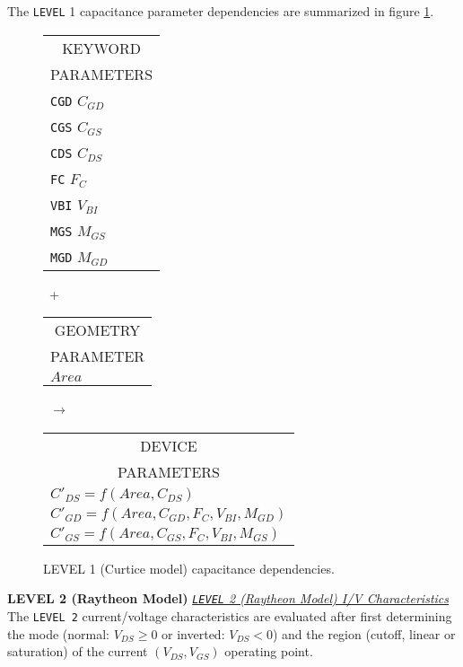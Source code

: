 The {\tt LEVEL} 1 capacitance parameter dependencies are summarized in figure
\ref{blevel1cap}.\\[0.2in]
\begin{figure}[h]
\begin{tabular}[t]{|p{1in}|}
\hline
\multicolumn{1}{|c|}{KEYWORD} \\
\multicolumn{1}{|c|}{PARAMETERS} \\
\hline
\hline
{\tt CGD} \hfill $C_{GD}$\\
{\tt CGS} \hfill $C_{GS}$\\
{\tt CDS} \hfill $C_{DS}$\\
{\tt FC} \hfill $F_C$\\
{\tt VBI} \hfill $V_{BI}$\\
{\tt MGS} \hfill $M_{GS}$\\
{\tt MGD} \hfill $M_{GD}$\\
\hline
\end{tabular}
\hfill
\parbox{0.2in}{\ \vspace*{0.2in}\newline +}
\hfill
\begin{tabular}[t]{|p{1in}|}
\hline
\multicolumn{1}{|c|}{GEOMETRY} \\
\multicolumn{1}{|c|}{PARAMETER} \\
\hline
\hspace*{\fill}$Area$\\
\hline
\end{tabular}
\hfill
\parbox{0.2in}{\ \vspace*{0.2in}\newline $\rightarrow$}
\hfill
\begin{tabular}[t]{|p{1.8in}|}
\hline
\multicolumn{1}{|c|}{DEVICE} \\
\multicolumn{1}{|c|}{PARAMETERS} \\
\hline
$C'_{DS} = f(Area, C_{DS})$\\
$C'_{GD} =$\newline\hspace*{\fill}$ f(Area, C_{GD},F_C,V_{BI},M_{GD})$\\
$C'_{GS} =$\newline\hspace*{\fill}$ f(Area, C_{GS},F_C,V_{BI},M_{GS})$\\
\hline
\end{tabular}
\caption{LEVEL 1 (Curtice model) capacitance dependencies. \label{blevel1cap}}
\end{figure}

{\bf LEVEL 2 (Raytheon Model)}\myline
\noindent\underline{\sl {\tt LEVEL} 2 (Raytheon Model)
I/V Characteristics}\\[0.1in]
The {\tt LEVEL 2} current/voltage characteristics are evaluated after first
determining the mode (normal: $V_{DS} \ge 0$ or inverted:
$V_{DS} < 0$) and the region (cutoff,
linear or saturation) of the current
$(V_{DS}, V_{GS})$ operating point.\\[0.1in]

